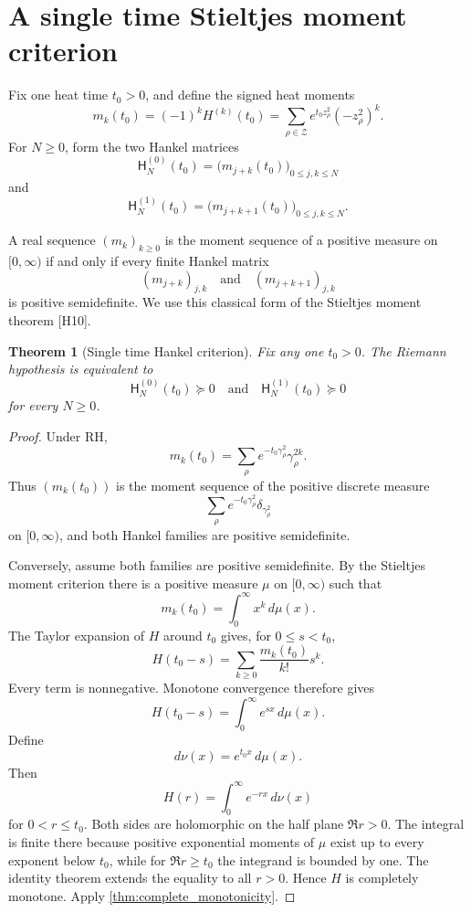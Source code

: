 \documentclass{aomart}
\newtheorem{theorem}{Theorem}[section]
\theoremstyle{definition}
\theoremstyle{remark}
\newcommand{\calZ}{\mathcal Z}
\newcommand{\refcode}[1]{\textnormal{[#1]}}
\begin{document}
\section{A single time Stieltjes moment criterion}\label{sec:stieltjes}

Fix one heat time \(t_0>0\), and define the signed heat moments
\[
 \boxed{
 m_k(t_0)
 =
 (-1)^kH^{(k)}(t_0)
 =
 \sum_{\rho\in\calZ}
 e^{t_0z_\rho^2}(-z_\rho^2)^k.
 }
\]
For \(N\geq0\), form the two Hankel matrices
\[
 \mathsf H_N^{(0)}(t_0)
 =
 \bigl(m_{j+k}(t_0)\bigr)_{0\leq j,k\leq N}
\]
and
\[
 \mathsf H_N^{(1)}(t_0)
 =
 \bigl(m_{j+k+1}(t_0)\bigr)_{0\leq j,k\leq N}.
\]

\begin{standardfact}\label{fact:stieltjes_moment}
A real sequence \((m_k)_{k\geq0}\) is the moment sequence of a positive measure on \([0,\infty)\) if and only if every finite Hankel matrix
\[
 (m_{j+k})_{j,k}
 \quad\text{and}\quad
 (m_{j+k+1})_{j,k}
\]
is positive semidefinite. We use this classical form of the Stieltjes moment theorem \refcode{H10}.
\end{standardfact}

\begin{theorem}[Single time Hankel criterion]\label{thm:single_time_hankel}
Fix any one \(t_0>0\). The Riemann hypothesis is equivalent to
\[
 \boxed{
 \mathsf H_N^{(0)}(t_0)\succeq0
 \quad\text{and}\quad
 \mathsf H_N^{(1)}(t_0)\succeq0
 }
\]
for every \(N\geq0\).
\end{theorem}

\begin{proof}
Under RH,
\[
 m_k(t_0)
 =
 \sum_\rho
 e^{-t_0\gamma_\rho^2}\gamma_\rho^{2k}.
\]
Thus \((m_k(t_0))\) is the moment sequence of the positive discrete measure
\[
 \sum_\rho
 e^{-t_0\gamma_\rho^2}
 \delta_{\gamma_\rho^2}
\]
on \([0,\infty)\), and both Hankel families are positive semidefinite.

Conversely, assume both families are positive semidefinite. By the Stieltjes moment criterion there is a positive measure \(\mu\) on \([0,\infty)\) such that
\[
 m_k(t_0)=\int_0^\infty x^k\,d\mu(x).
\]
The Taylor expansion of \(H\) around \(t_0\) gives, for \(0\leq s<t_0\),
\[
 H(t_0-s)
 =
 \sum_{k\geq0}\frac{m_k(t_0)}{k!}s^k.
\]
Every term is nonnegative. Monotone convergence therefore gives
\[
 H(t_0-s)
 =
 \int_0^\infty e^{sx}\,d\mu(x).
\]
Define
\[
 d\nu(x)=e^{t_0x}\,d\mu(x).
\]
Then
\[
 H(r)=\int_0^\infty e^{-rx}\,d\nu(x)
\]
for \(0<r\leq t_0\). Both sides are holomorphic on the half plane \(\Re r>0\). The integral is finite there because positive exponential moments of \(\mu\) exist up to every exponent below \(t_0\), while for \(\Re r\geq t_0\) the integrand is bounded by one. The identity theorem extends the equality to all \(r>0\). Hence \(H\) is completely monotone. Apply \cref{thm:complete_monotonicity}.
\end{proof}
\end{document}
